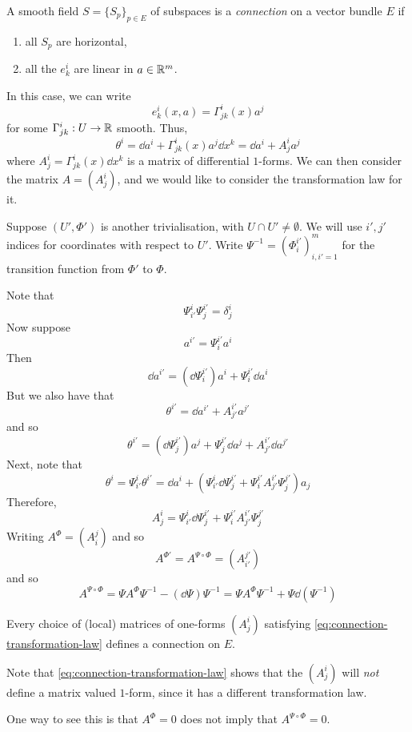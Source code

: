 \documentclass{article}
\begin{document}
\begin{definition}
    [connection] A smooth field \(S = \{S_p\}_{p \in E}\) of subspaces is a \emph{connection} on a vector bundle \(E\) if
    \begin{enumerate}
        \item all \(S_p\) are horizontal,
        \item all the \(e^i_k\) are linear in \(a \in \mathbb{R}^m\).
    \end{enumerate} 
\end{definition}
In this case, we can write
\[e^i_k(x, a) = \Gamma^i_{jk}(x)a^j\]
for some \(\Gamma^i_{jk} : U \to \mathbb{R}\) smooth. Thus,
\[\theta^i = \dd a^i + \Gamma^i_{jk}(x)a^j\dd x^k = \dd a^i + A^i_j a^j\]
where \(A^i_j = \Gamma^i_{jk}(x)\dd x^k\) is a matrix of differential \(1\)-forms. We can then consider the matrix \(A = (A^i_j)\), and we would like to consider the transformation law for it.

Suppose \((U', \Phi')\) is another trivialisation, with \(U \cap U' \ne \emptyset\). We will use \(i', j'\) indices for coordinates with respect to \(U'\). Write \(\Psi^{-1} = (\Phi_i^{i'})_{i, i' = 1}^m\) for the transition function from \(\Phi'\) to \(\Phi\).

Note that
\[\Psi^i_{i'}\Psi^{i'}_j = \delta^i_j\]
Now suppose
\[a^{i'} = \Psi^{i'}_ia^i\]
Then
\[\dd a^{i'} = \left(\dd \Psi^{i'}_i\right)a^i + \Psi^{i'}_i \dd a^i\]
\lec
But we also have that
\[\theta^{i'} = \dd a^{i'} + A^{i'}_{j'}a^{j'}\]
and so
\[\theta^{i'} = (\dd \Psi_j^{i'})a^j + \Psi_j^{i'}\dd a^j + A^{i'}_{j'}\dd a^{j'}\]
Next, note that
\[\theta^i = \Psi^i_{i'}\theta^{i'} = \dd a^i + (\Psi^i_{i'}\dd \Psi_j^{i'} + \Psi_i^{i'}A_{j'}^{i'}\Psi_j^{j'})a_j\]
Therefore,
\[A^i_j = \Psi^i_{i'}\dd \Psi_j^{i'} + \Psi_i^{i'}A_{j'}^{i'}\Psi_j^{j'}\]
Writing \(A^\Phi = (A_i^j)\) and so
\[A^{\Phi'} = A^{\Psi \circ \Phi} = (A_{i'}^{j'})\]
and so
\begin{equation}
    \label{eq:connection-transformation-law}
    A^{\Psi \circ \Phi} = \Psi A^\Phi \Psi^{-1} - (\dd \Psi)\Psi^{-1} = \Psi A^\Phi \Psi^{-1} + \Psi \dd(\Psi^{-1})
\end{equation}

\begin{theorem}
    Every choice of (local) matrices of one-forms \((A^i_j)\) satisfying \cref{eq:connection-transformation-law} defines a connection on \(E\).
\end{theorem}

\begin{remark}
    Note that \cref{eq:connection-transformation-law} shows that the \((A^i_j)\) will \emph{not} define a matrix valued \(1\)-form, since it has a different transformation law.

    One way to see this is that \(A^\Phi = 0\) does not imply that \(A^{\Psi \circ \Phi} = 0\).
\end{remark}
\end{document}

